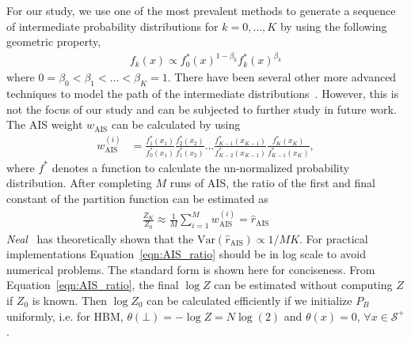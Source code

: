 \documentclass[letterpaper]{article} %
\begin{document}
				For our study, we use one of the most prevalent methods to generate a sequence of intermediate probability distributions for $k=0, \ldots, K$ by using the following geometric property,
				\begin{align*}
					f_{k} \left( x \right) \propto f^{*}_{0} \left( x \right)^{1 - \beta_k} f^{*}_{k} \left( x \right)^{\beta_k}
				\end{align*}
				where $0 = \beta_0 < \beta_1 < \ldots < \beta_K = 1$. There have been several other more advanced techniques to model the path of the intermediate distributions~\cite{grosse2013annealing}. However, this is not the focus of our study and can be subjected to further study in future work. The AIS weight $w_{\mathrm{AIS}}$ can be calculated by using
				\begin{align*}
					w_{\mathrm{AIS}}^{\left( i \right)} &= \frac{ f^{*}_{1} \left( x_{1} \right) }{ f^{*}_{0} \left( x_{1} \right) } \frac{ f^{*}_{2} \left( x_{2} \right) }{ f^{*}_{1} \left( x_{2} \right) } \ldots \frac{ f^{*}_{K-1} \left( x_{K-1} \right) }{ f^{*}_{K-2} \left( x_{K-1} \right) } \frac{ f^{*}_{K} \left( x_{K} \right) }{ f^{*}_{K-1} \left( x_{K} \right) },
				\end{align*}
				where $f^{*}$ denotes a function to calculate the un-normalized probability distribution. After completing $M$ runs of AIS, the ratio of the first and final constant of the partition function can be estimated as
				\begin{align}
					\frac{Z_K}{Z_0} \approx \frac{1}{M} \sum_{i=1}^{M} w_{\mathrm{AIS}}^{\left( i \right)} = \hat{r}_{\mathrm{AIS}} \label{eqn:AIS_ratio}
				\end{align}
				\textit{Neal}~\cite{neal2001annealed,neal2005estimating} has theoretically shown that the $\mathrm{Var} \left( \hat{r}_{\mathrm{AIS}} \right) \propto 1 / MK$. For practical implementations Equation~\eqref{eqn:AIS_ratio} should be in log scale to avoid numerical problems. The standard form is shown here for conciseness. From Equation~\eqref{eqn:AIS_ratio}, the final $\log Z $ can be estimated without computing $Z$ if $Z_0$ is known. Then $\log Z_0$ can be calculated efficiently if we initialize $P_B$ uniformly, i.e. for HBM, $ \theta \left( \bot \right) = - \log Z = N \log \left(2 \right) $ and $ \theta \left( x \right) = 0$, $\forall x\in \mathcal{S}^+ $.			
\end{document}
